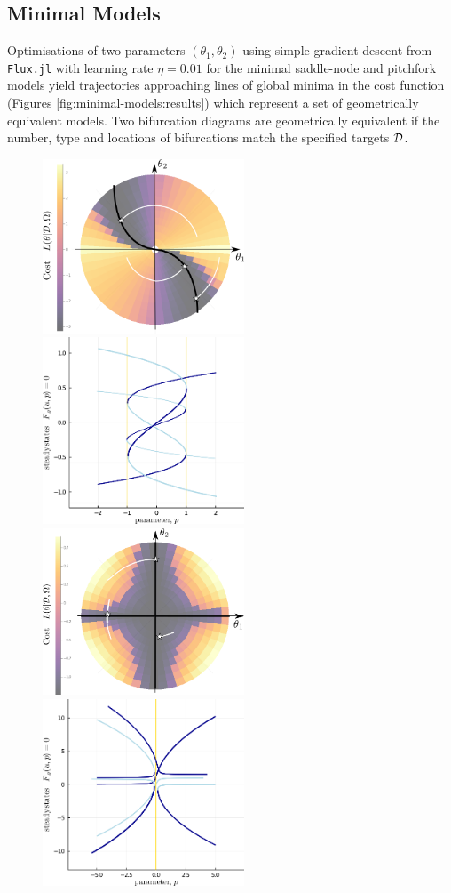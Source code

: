 \documentclass{article}
\begin{document}
\subsection{Minimal Models}
Optimisations of two parameters $(\theta_1,\theta_2)$ using simple gradient descent from \texttt{Flux.jl} with learning rate $\eta=0.01$ for the minimal saddle-node and pitchfork models yield trajectories approaching lines of global minima in the cost function (Figures \ref{fig:minimal-models:results}) which represent a set of geometrically equivalent models. Two bifurcation diagrams are geometrically equivalent if the number, type and locations of bifurcations match the specified targets $\mathcal{D}$.

\begin{figure}[ht]
\centering
\includegraphics[width=6cm]{saddle-landscape.png}
\includegraphics[width=6cm]{saddle-optima.png}
\includegraphics[width=6cm]{pitchfork-landscape.png}
\includegraphics[width=6cm]{pitchfork-optima.png}

\end{figure}
\end{document}
